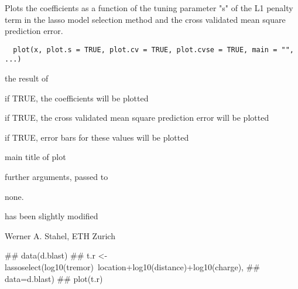 \documentclass{article}
\begin{document}
\begin{Description}\relax
Plots the coefficients as a function of the tuning parameter "s" of
the L1 penalty term in the lasso model selection method and the cross
validated mean square prediction error.
\end{Description}
\begin{Usage}
\begin{verbatim}
  plot(x, plot.s = TRUE, plot.cv = TRUE, plot.cvse = TRUE, main = "", ...)
\end{verbatim}
\end{Usage}
\begin{Arguments}
\begin{ldescription}
\item[\code{x}] the result of 
\item[\code{plot.s}] if TRUE, the coefficients will be plotted
\item[\code{plot.cv}] if TRUE, the cross validated mean square prediction
error will be plotted
\item[\code{plot.cvse}] if TRUE, error bars for these values will be plotted
\item[\code{main}] main title of plot
\item[\code{...}] further arguments, passed to 
\end{ldescription}
\end{Arguments}
\begin{Value}
none.
\end{Value}
\begin{Note}\relax
{} has been slightly modified
\end{Note}
\begin{Author}\relax
Werner A. Stahel, ETH Zurich
\end{Author}
\begin{SeeAlso}\relax
{}
\end{SeeAlso}
\begin{Examples}
\begin{ExampleCode}
## data(d.blast)
## t.r <- lassoselect(log10(tremor)~location+log10(distance)+log10(charge),
##                    data=d.blast)
## plot(t.r)
\end{ExampleCode}
\end{Examples}
\end{document}
